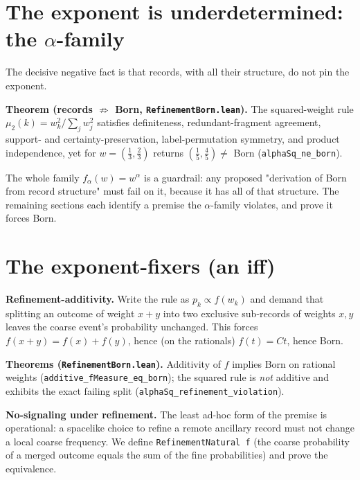 \documentclass[11pt,a4paper]{article}
\newenvironment{qiqtquote}{\begin{mdframed}[style=quotestyle]}{\end{mdframed}}
\begin{document}
\section{The exponent is underdetermined: the $\alpha$-family}

The decisive negative fact is that records, with all their structure, do not pin the exponent.

\begin{qiqtquote}
\textbf{Theorem (records $\not\Rightarrow$ Born, \texttt{RefinementBorn.lean}).} The squared-weight rule
$\mu_2(k)=w_k^2/\sum_j w_j^2$ satisfies definiteness, redundant-fragment agreement, support- and
certainty-preservation, label-permutation symmetry, and product independence, yet for $w=(\tfrac13,\tfrac23)$
returns $(\tfrac15,\tfrac45)\neq$ Born (\texttt{alphaSq\_ne\_born}).
\end{qiqtquote}

The whole family $f_\alpha(w)=w^\alpha$ is a guardrail: any proposed "derivation of Born from record
structure" must fail on it, because it has all of that structure. The remaining sections each identify a
premise the $\alpha$-family violates, and prove it forces Born.

\section{The exponent-fixers (an iff)}

\textbf{Refinement-additivity.} Write the rule as $p_k\propto f(w_k)$ and demand that splitting an outcome of
weight $x+y$ into two exclusive sub-records of weights $x,y$ leaves the coarse event's probability unchanged.
This forces $f(x+y)=f(x)+f(y)$, hence (on the rationals) $f(t)=Ct$, hence Born.

\begin{qiqtquote}
\textbf{Theorems (\texttt{RefinementBorn.lean}).} Additivity of $f$ implies Born on rational weights
(\texttt{additive\_fMeasure\_eq\_born}); the squared rule is \emph{not} additive and exhibits the exact failing split
(\texttt{alphaSq\_refinement\_violation}).
\end{qiqtquote}

\textbf{No-signaling under refinement.} The least ad-hoc form of the premise is operational: a spacelike choice to
refine a remote ancillary record must not change a local coarse frequency. We define
\texttt{RefinementNatural f} (the coarse probability of a merged outcome equals the sum of the fine probabilities)
and prove the equivalence.
\end{document}
